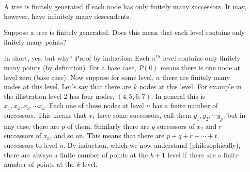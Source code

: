 \begin{definition}
A tree is finitely generated if each node has only finitely many successors.  It may, however, have infinitely many descendents.
\end{definition}

\begin{problem} Suppose a tree is finitely generated.  Does this mean that each level contains only finitely many points?

\ifKey
\hfill \begin{minipage}{0.75\textwidth}
\color{red} In short, yes.  but why?  Proof by induction: Each $n^{th}$ level contains only finitely many points (by definition).  For a base case, $P(0)$ means there is one node at level zero (base case).  Now suppose for some level, $n$ there are finitely many nodes at this level.  Let's say that there are $k$ nodes at this level.  For example in the illistration level 2 has four nodes, $(4, 5, 6, 7)$. In general this is $x_1, x_2, x_3, \cdots x_k$.  Each one of these nodes at level $n$ has a finite number of successors.  This means that $x_1$ have some successors, call them $y_1, y_2, \cdots y_p$, but in any case, there are $p$ of them.  Similarly there are $q$ successors of $x_2$ and $r$ successors of $x_3$, and so on.  This means that there are $p+q+r+\cdots+ t$ successors to level $n$.  By induction, which we now understand (philosophically), there are always a finite number of points at the $k+1$ level if there are a finite number of points at the $k$ level.  
\end{minipage}
\color{black}
\fi
\end{problem}

